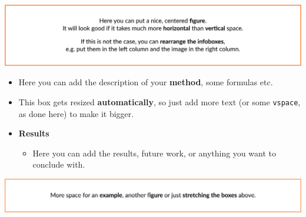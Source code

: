 \documentclass[a0paper,fleqn,noleftcolumns]{betterposter}
\begin{document}
{\begin{multicols}{2}
\begin{tcolorbox}[colframe=black!65!white,title=Data \& Templates]
    \vspace{0.8em}
  \end{tcolorbox}
\end{multicols}

\begin{center}
    \vspace*{3em}
    \includegraphics[]{img/1}
    \vspace*{3em}
\end{center}

\begin{multicols}{2}
    \begin{tcolorbox}[colframe=black!80!white,title=Method]
        \vspace{2.5em}
        \begin{itemize}[label=\adfrightarrowhead,leftmargin=*,labelsep=0.5em,itemsep=0.5em]
            \item Here you can add the description of your \textbf{method}, some formulas etc.
            \item This box gets resized \textbf{automatically}, so just add more text (or some \texttt{vspace}, as done here) to make it bigger.
        \end{itemize}
        \vspace{2.5em}
    \end{tcolorbox}


    \begin{tcolorbox}[colframe=ufal,title=Results \& Future Work]
    \vspace{3.5em}
    \begin{itemize}[label=\adfrightarrowhead,leftmargin=*,labelsep=0.5em,itemsep=1em]
        \item \textbf{Results}
        \begin{itemize}
            \item Here you can add the results, future work, or anything you want to conclude with.
        \end{itemize}
    \end{itemize}
    \vspace{3.5em}

  \end{tcolorbox}
\end{multicols}


\begin{center}
    \vspace*{3em}
    \includegraphics{img/2}
    \vspace*{3em}
\end{center}

}{
}
\end{document}
